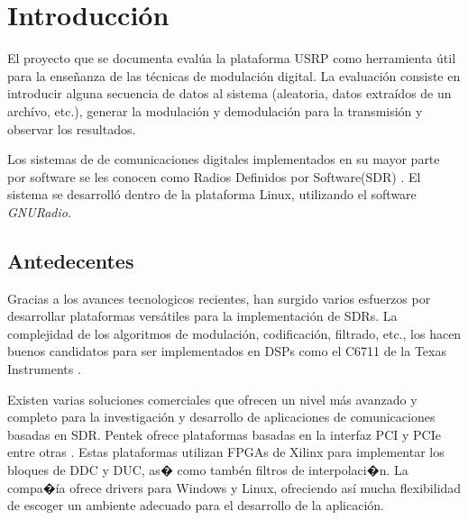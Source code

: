 \chapter{Introducci\'on}

El proyecto que se documenta eval\'ua la plataforma USRP como herramienta
\'util para la ense\~nanza de las t\'ecnicas de modulaci\'on digital. La
evaluaci\'on consiste en introducir alguna secuencia de datos al sistema
(aleatoria, datos extra\'idos de un arch\'ivo, etc.), generar la modulaci\'on y
demodulaci\'on para la transmisi\'on y observar los resultados.

Los sistemas de de comunicaciones digitales implementados en su  mayor parte por
software se les conocen como Radios Definidos por
Software(SDR) \cite{mitola}. El sistema se desarroll\'o dentro de la plataforma
Linux, utilizando el software \emph{GNURadio}.

\section{Antedecentes}%

Gracias a los avances tecnologicos recientes, han surgido varios esfuerzos por
desarrollar plataformas vers\'atiles para la implementaci\'on de SDRs.
La complejidad de los algoritmos de modulaci\'on, codificaci\'on, filtrado,
etc., los hacen buenos candidatos para ser implementados en DSPs como el C6711 de la Texas
Instruments \cite{abendroth}.

Existen varias soluciones comerciales que ofrecen un nivel m\'as avanzado y
completo para la investigaci\'on y desarrollo de aplicaciones de comunicaciones
basadas en SDR. Pentek ofrece plataformas basadas en la interfaz PCI y PCIe
entre otras \cite{pentek}. Estas plataformas utilizan FPGAs de Xilinx para 
implementar los bloques de DDC y DUC, as� como tamb\'en filtros de interpolaci�n. La compa�\'ia
ofrece drivers para Windows y Linux, ofreciendo as\'i mucha flexibilidad de
escoger un ambiente adecuado para el desarrollo de la aplicaci\'on.

